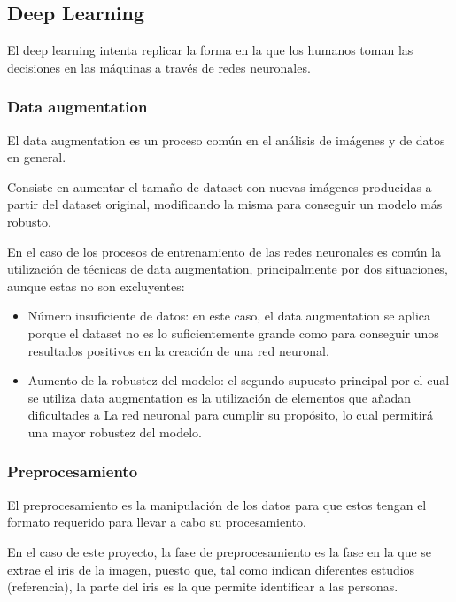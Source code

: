 \subsection{Deep Learning}

El deep learning intenta replicar la forma en la que los humanos toman las decisiones en las máquinas a través de redes neuronales.

\subsubsection{Data augmentation}

El data augmentation es un proceso común en el análisis de imágenes y de datos en general. 

Consiste en aumentar el tamaño de dataset con nuevas imágenes producidas a partir del dataset original, modificando la misma para conseguir un modelo más robusto.	

En el caso de los procesos de entrenamiento de las redes neuronales es común
la utilización de técnicas de data augmentation, principalmente por dos situaciones, aunque estas no son excluyentes:

\begin{itemize}
	\item Número insuficiente de datos: en este caso, el data augmentation se aplica porque el dataset no es lo suficientemente grande como para conseguir unos resultados 
positivos en la creación de una red neuronal.
	\item Aumento de la robustez del modelo: el segundo supuesto principal por el cual se utiliza data augmentation es la utilización de elementos que añadan dificultades a La
red neuronal para cumplir su propósito, lo cual permitirá una mayor robustez del modelo.
\end{itemize}

\subsubsection{Preprocesamiento}

El preprocesamiento es la manipulación de los datos para que estos tengan el formato requerido para llevar a cabo su procesamiento.

En el caso de este proyecto, la fase de preprocesamiento es la fase en la que se extrae el iris de la imagen, puesto que, tal como indican diferentes estudios (referencia), la parte del iris es la que 
permite identificar a las personas.

